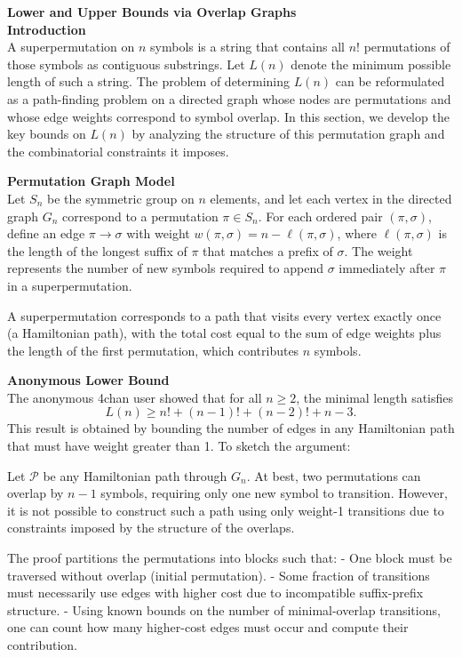 \begin{technical}
{\Large\textbf{Lower and Upper Bounds via Overlap Graphs}}\\[0.7em]

\noindent\textbf{Introduction}\\[0.5em]
A superpermutation on \(n\) symbols is a string that contains all \(n!\) permutations of those symbols as contiguous substrings. Let \(L(n)\) denote the minimum possible length of such a string. The problem of determining \(L(n)\) can be reformulated as a path-finding problem on a directed graph whose nodes are permutations and whose edge weights correspond to symbol overlap. In this section, we develop the key bounds on \(L(n)\) by analyzing the structure of this permutation graph and the combinatorial constraints it imposes.

\noindent\textbf{Permutation Graph Model}\\[0.5em]
Let \(S_n\) be the symmetric group on \(n\) elements, and let each vertex in the directed graph \(G_n\) correspond to a permutation \(\pi \in S_n\). For each ordered pair \((\pi, \sigma)\), define an edge \(\pi \rightarrow \sigma\) with weight \(w(\pi, \sigma) = n - \ell(\pi, \sigma)\), where \(\ell(\pi, \sigma)\) is the length of the longest suffix of \(\pi\) that matches a prefix of \(\sigma\). The weight represents the number of new symbols required to append \(\sigma\) immediately after \(\pi\) in a superpermutation.

A superpermutation corresponds to a path that visits every vertex exactly once (a Hamiltonian path), with the total cost equal to the sum of edge weights plus the length of the first permutation, which contributes \(n\) symbols.

\noindent\textbf{Anonymous Lower Bound}\\[0.5em]
The anonymous 4chan user showed that for all \(n \ge 2\), the minimal length satisfies
\[
L(n) \ge n! + (n-1)! + (n-2)! + n - 3.
\]
This result is obtained by bounding the number of edges in any Hamiltonian path that must have weight greater than 1. To sketch the argument:

Let \(\mathcal{P}\) be any Hamiltonian path through \(G_n\). At best, two permutations can overlap by \(n-1\) symbols, requiring only one new symbol to transition. However, it is not possible to construct such a path using only weight-1 transitions due to constraints imposed by the structure of the overlaps.

The proof partitions the permutations into blocks such that:
- One block must be traversed without overlap (initial permutation).
- Some fraction of transitions must necessarily use edges with higher cost due to incompatible suffix-prefix structure.
- Using known bounds on the number of minimal-overlap transitions, one can count how many higher-cost edges must occur and compute their contribution.


\end{technical}
